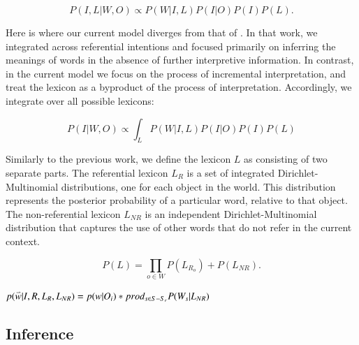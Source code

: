 \documentclass[man,noapacite,12pt]{apa2}
\newcommand{\vect}[1]{\accentset{\rightharpoonup}{#1}}
\begin{document}
\begin{equation}
P( I, L | W, O) \propto P(W | I, L) P(I | O) P(I) P(L).
\end{equation}

Here is where our current model diverges from that of . In that work, we integrated across referential intentions and focused primarily on inferring the meanings of words in the absence of further interpretive information. In contrast, in the current model we focus on the process of incremental interpretation, and treat the lexicon as a byproduct of the process of interpretation. Accordingly, we integrate over all possible lexicons:

\begin{equation}
P( I| W, O) \propto \int_L{P(W | I, L) P(I | O) P(I)  P(L) }
\end{equation}

Similarly to the previous work, we define the lexicon $L$ as consisting of two separate parts. The referential lexicon $L_R$ is a set of integrated Dirichlet-Multinomial distributions, one for each object in the world. This distribution represents the posterior probability of a particular word, relative to that object. The non-referential lexicon $L_{NR}$ is an independent Dirichlet-Multinomial distribution that captures the use of other words that do not refer in the current context.

\begin{equation}
P(L) = \prod_{o \in W}{P(L_{R_o})} + P(L_{NR}).
\end{equation}

 



$p(\vect{w} | I, R, L_R, L_{NR}) = p(w|O_i) * prod_{s \in S - S_r} {P(W_s | L_{NR})}$

\subsection{Inference}
\end{document}
